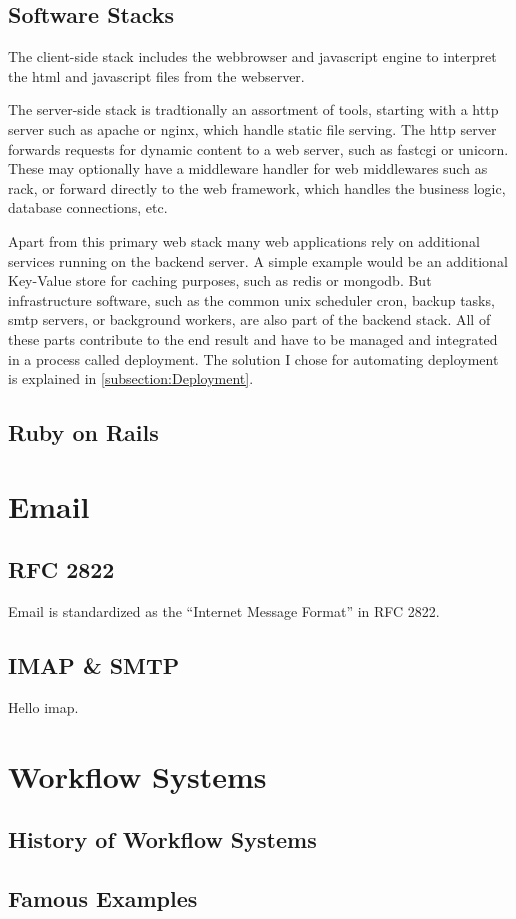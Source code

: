 \subsection{Software Stacks}

The client-side stack includes the webbrowser and \gls{javascript} engine to interpret the \gls{html} and \gls{javascript} files from the webserver.

The server-side stack is tradtionally an assortment of tools, starting with a \gls{http} server such as \gls{apache} or \gls{nginx}, which handle static file serving. The \gls{http} server forwards requests for dynamic content to a web server, such as \gls{fastcgi} or \gls{unicorn}. These may optionally have a middleware handler for web middlewares such as \gls{rack}, or forward directly to the web framework, which handles the business logic, database connections, etc.

Apart from this primary web stack many web applications rely on additional services running on the backend server. A simple example would be an additional Key-Value store for caching purposes, such as \gls{redis} or \gls{mongodb}. But infrastructure software, such as the common unix scheduler \gls{cron}, backup tasks, \gls{smtp} servers, or background workers, are also part of the backend stack. All of these parts contribute to the end result and have to be managed and integrated in a process called deployment. The solution I chose for automating deployment is explained in \autoref{subsection:Deployment}.

\subsection{Ruby on Rails}





\section{Email}


\subsection{RFC 2822}

Email is standardized as the ``Internet Message Format'' in RFC 2822\cite{email}.

\subsection{IMAP \& SMTP}

Hello \gls{imap}.


\section{Workflow Systems}


\subsection{History of Workflow Systems}


\subsection{Famous Examples}